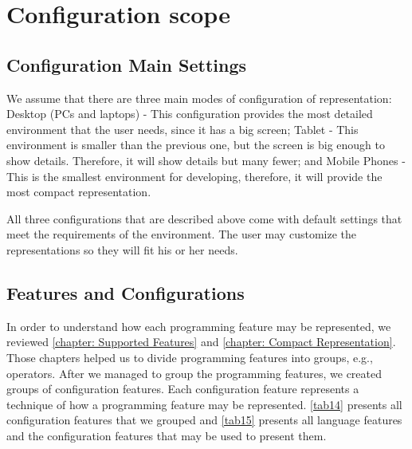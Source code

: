 \section{Configuration scope}
\subsection{Configuration Main Settings}
We assume that there are three main modes of configuration of representation: Desktop (PCs and laptops) - This configuration provides the most detailed environment that the user needs, since it has a big screen; Tablet - This environment is smaller than the previous one, but the screen is big enough to show details. Therefore, it will show details but many fewer; and Mobile Phones - This is the smallest environment for developing, therefore, it will provide the most compact representation. 

All three configurations that are described above come with default settings that meet the requirements of the environment. The user may customize the representations so they will fit his or her needs.
\subsection{Features and Configurations}
In order to understand how each programming feature may be represented, we reviewed \autoref{chapter: Supported Features} and \autoref{chapter: Compact Representation}. Those chapters helped us to divide programming features into groups, e.g., operators. After we managed to group the programming features, we created groups of configuration features. Each configuration feature represents a technique of how a programming feature may be represented.
\autoref{tab14} presents all configuration features that we grouped and \autoref{tab15} presents all language features and the configuration features that may be used to present them.

